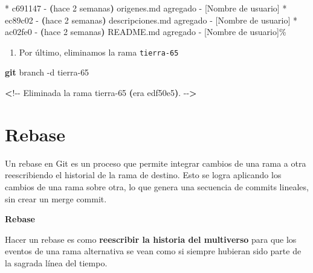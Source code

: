 \documentclass[
]{book}
\newenvironment{Shaded}{\begin{snugshade}}{\end{snugshade}}
\newcommand{\AttributeTok}[1]{\textcolor[rgb]{0.13,0.29,0.53}{#1}}
\newcommand{\BuiltInTok}[1]{#1}
\newcommand{\ErrorTok}[1]{\textcolor[rgb]{0.64,0.00,0.00}{\textbf{#1}}}
\newcommand{\ExtensionTok}[1]{#1}
\newcommand{\FunctionTok}[1]{\textcolor[rgb]{0.13,0.29,0.53}{\textbf{#1}}}
\newcommand{\KeywordTok}[1]{\textcolor[rgb]{0.13,0.29,0.53}{\textbf{#1}}}
\newcommand{\NormalTok}[1]{#1}
\newcommand{\OperatorTok}[1]{\textcolor[rgb]{0.81,0.36,0.00}{\textbf{#1}}}
\providecommand{\tightlist}{%
  \setlength{\itemsep}{0pt}\setlength{\parskip}{0pt}}
\begin{document}
\begin{Shaded}
\begin{Highlighting}[]
\ExtensionTok{*}\NormalTok{ c691147 }\AttributeTok{{-}} \ErrorTok{(}\ExtensionTok{hace}\NormalTok{ 2 semanas}\KeywordTok{)} \ExtensionTok{origenes.md}\NormalTok{ agregado }\AttributeTok{{-}}\NormalTok{ [Nombre de usuario]}
\ExtensionTok{*}\NormalTok{ ec89c02 }\AttributeTok{{-}} \ErrorTok{(}\ExtensionTok{hace}\NormalTok{ 2 semanas}\KeywordTok{)} \ExtensionTok{descripciones.md}\NormalTok{ agregado }\AttributeTok{{-}}\NormalTok{ [Nombre de usuario]}
\ExtensionTok{*}\NormalTok{ ac02fe0 }\AttributeTok{{-}} \ErrorTok{(}\ExtensionTok{hace}\NormalTok{ 2 semanas}\KeywordTok{)} \ExtensionTok{README.md}\NormalTok{ agregado }\AttributeTok{{-}}\NormalTok{ [Nombre de usuario]\% }
\end{Highlighting}
\end{Shaded}

\begin{enumerate}
\def\labelenumi{\arabic{enumi}.}
\setcounter{enumi}{9}
\tightlist
\item
  Por último, eliminamos la rama \texttt{tierra-65}
\end{enumerate}

\begin{Shaded}
\begin{Highlighting}[]
\FunctionTok{git}\NormalTok{ branch }\AttributeTok{{-}d}\NormalTok{ tierra{-}65}
\end{Highlighting}
\end{Shaded}

\begin{Shaded}
\begin{Highlighting}[]
\OperatorTok{\textless{}}\NormalTok{!{-}{-} }\ExtensionTok{Eliminada}\NormalTok{ la rama tierra{-}65 }\ErrorTok{(}\ExtensionTok{era}\NormalTok{ edf50e5}\KeywordTok{)}\BuiltInTok{.} \AttributeTok{{-}{-}}\OperatorTok{\textgreater{}}
\end{Highlighting}
\end{Shaded}

\section{Rebase}\label{rebase}

Un rebase en Git es un proceso que permite integrar cambios de una rama a otra reescribiendo el historial de la rama de destino. Esto se logra aplicando los cambios de una rama sobre otra, lo que genera una secuencia de commits lineales, sin crear un merge commit.

\textbf{Rebase}

Hacer un rebase es como \textbf{reescribir la historia del multiverso} para que los eventos de una rama alternativa se vean como si siempre hubieran sido parte de la sagrada línea del tiempo.
\end{document}
